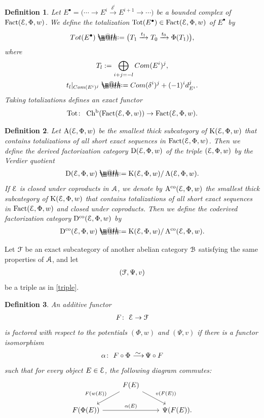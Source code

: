 \documentclass[11pt]{article}
\makeatletter
\numberwithin{equation}{section}
\newtheorem{dfn}{Definition}[section]
\newcommand*{\defeq}{\mathrel{\rlap{%
 \raisebox{0.3ex}{$\m@th\cdot$}}%
 \raisebox{-0.3ex}{$\m@th\cdot$}}%
 =}
\numberwithin{equation}{section}
\newcommand{\Chb}{\operatorname{Ch^{b}}}
\newcommand{\Fact}{\operatorname{Fact}}
\newcommand{\Tot}{\operatorname{Tot}}
\newcommand{\Dco}{\operatorname{D^{co}}}
\newcommand{\D}{\operatorname{D}}
\newcommand{\Aco}{\operatorname{A^{co}}}
\newcommand{\A}{\operatorname{A}}
\newcommand{\K}{\operatorname{K}}
\newcommand{\scrA}{\EuScript{A}}
\newcommand{\scrB}{\EuScript{B}}
\newcommand{\scrE}{\EuScript{E}}
\newcommand{\scrF}{\EuScript{F}}
\newcommand{\simto}{\,\,\,\,\raisebox{4pt}{$\sim$}{\kern -1.1em \longrightarrow}\,}
\makeatother
\begin{document}
\begin{dfn}
Let $E^{\bullet}=\big(\cdots\rightarrow E^i\xrightarrow{\delta^i}E^{i+1}\rightarrow\cdots\big)$ be a bounded complex of $\Fact(\scrE,\Phi,w)$. We define the {\it totalization} $\Tot(E^{\bullet})\in\Fact(\scrE,\Phi,w)$ of $E^{\bullet}$ by
\begin{gather*}
{\rm Tot}(E^{\bullet})\defeq\big(T_1\xrightarrow{t_1}T_0\xrightarrow{t_0}\Phi(T_1)\big),
\end{gather*}
where
\begin{gather*}
T_l:=\bigoplus_{i+j=-l}{\rm Com}(E^i)^j,
\\
t_l|_{{\rm Com}(E^i)^j}\defeq{\rm Com}(\delta^i)^j+(-1)^id_{E^i}^j.
\end{gather*}
Taking totalizations defines an exact functor
\begin{gather*}
\Tot\colon\ \Chb(\Fact(\scrE,\Phi,w))\rightarrow \Fact(\scrE,\Phi,w).
\end{gather*}
\end{dfn}

\begin{dfn}
Let $\A(\scrE,\Phi,w)$ be the smallest thick subcategory of $\K(\scrE,\Phi,w)$ that contains tota\-lizations of all short exact sequences in $\Fact(\scrE,\Phi,w)$. Then we define the {\it derived factorization category} $\D(\scrE,\Phi,w)$ of the triple $(\scrE,\Phi,w)$ by the Verdier quotient
\begin{gather*}
\D(\scrE,\Phi,w)\defeq\K(\scrE,\Phi,w)/\A(\scrE,\Phi,w).
\end{gather*}
If $\scrE$ is closed under coproducts in $\scrA$, we denote by
$\Aco(\scrE,\Phi,w)$ the smallest thick subcategory of $\K(\scrE,\Phi,w)$ that contains totalizations of all short exact sequences in $\Fact(\scrE,\Phi,w)$ and closed under coproducts. Then we define the {\it coderived factorization category} $\Dco(\scrE,\Phi,w)$ by
\begin{gather*}
\Dco(\scrE,\Phi,w)\defeq\K(\scrE,\Phi,w)/\Aco(\scrE,\Phi,w).
\end{gather*}
\end{dfn}

Let $\scrF$ be an exact subcategory of another abelian category $\scrB$ satisfying the same properties of $\scrA$, and let
\begin{gather*}
(\scrF,\Psi,v)
\end{gather*} be a triple as in \eqref{triple}.

\begin{dfn} An additive functor
\begin{gather*}
F\colon\ \scrE \to \scrF
\end{gather*}
is {\it factored} with respect to the potentials $(\Phi,w)$ and $(\Psi,v)$ if there is a functor isomorphism
\begin{gather*}
\alpha\colon\ F\circ \Phi \simto \Psi\circ F
\end{gather*}
such that for every object $E\in \scrE$, the following diagram commutes:
\[
\begin{tikzcd}
&F(E)\arrow[ld, "F(w(E))"']\arrow[rd, "v(F(E))"]&\\
F(\Phi(E))\arrow[rr, "\alpha(E)"]&& \Psi(F(E)).
\end{tikzcd}
\]
\end{dfn}
\end{document}
